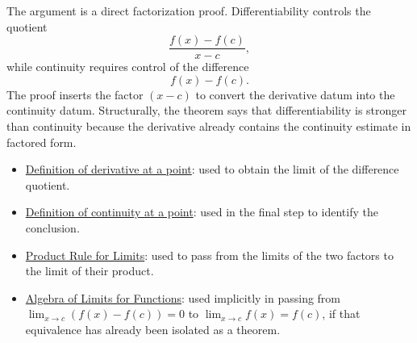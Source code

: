 \begin{remark*}
The argument is a direct factorization proof. Differentiability controls the quotient
\[
\frac{f(x)-f(c)}{x-c},
\]
while continuity requires control of the difference
\[
f(x)-f(c).
\]
The proof inserts the factor $(x-c)$ to convert the derivative datum into the continuity datum. Structurally, the theorem says that differentiability is stronger than continuity because the derivative already contains the continuity estimate in factored form.
\end{remark*}

\begin{remark*}[Dependencies]
\begin{itemize}
  \item \hyperref[def:derivative-at-a-point]{Definition of derivative at a point}: used to obtain the limit of the difference quotient.
  \item \hyperref[def:continuous-at-a-point]{Definition of continuity at a point}: used in the final step to identify the conclusion.
  \item \hyperref[thm:product-rule-for-limits-functions]{Product Rule for Limits}: used to pass from the limits of the two factors to the limit of their product.
  \item \hyperref[thm:algebra-of-limits-functions]{Algebra of Limits for Functions}: used implicitly in passing from
  \(\lim_{x\to c}(f(x)-f(c))=0\) to \(\lim_{x\to c}f(x)=f(c)\), if that equivalence has already been isolated as a theorem.
\end{itemize}
\end{remark*}




